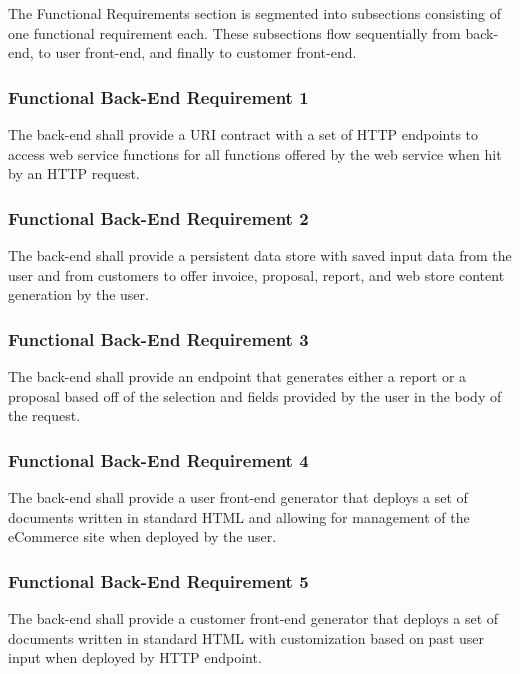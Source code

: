 \documentclass{article}
\begin{document}
The Functional Requirements section is segmented into subsections consisting of
one functional requirement each.  These subsections flow sequentially from
back-end, to user front-end, and finally to customer front-end.

\subsubsection{Functional Back-End Requirement 1}
\label{func-back-end-1}

The back-end shall provide a URI contract with a set of HTTP endpoints
to access web service functions for all functions offered by the web service
when hit by an HTTP request.

\subsubsection{Functional Back-End Requirement 2}
\label{func-back-end-2}

The back-end shall provide a persistent data store with saved input data from
the user and from customers to offer invoice, proposal, report, and web store
content generation by the user.

\subsubsection{Functional Back-End Requirement 3}
\label{func-back-end-3}

The back-end shall provide an endpoint that generates either a report or a
proposal based off of the selection and fields provided by the user in the
body of the request.

\subsubsection{Functional Back-End Requirement 4}
\label{func-back-end-4}

The back-end shall provide a user front-end generator that deploys a set of
documents written in standard HTML and allowing for management of the eCommerce
site when deployed by the user.

\subsubsection{Functional Back-End Requirement 5}
\label{func-back-end-5}

The back-end shall provide a customer front-end generator that deploys a set of
documents written in standard HTML with customization based on past
user input when deployed by HTTP endpoint.
\end{document}
